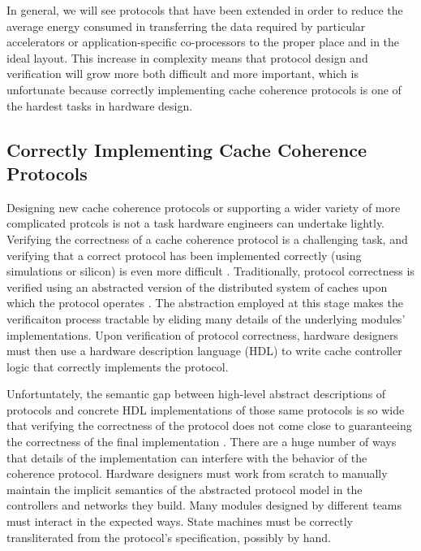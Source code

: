 In general, we will see protocols that have been extended in order to reduce the average energy consumed in transferring the data required by particular accelerators or application-specific co-processors to the proper place and in the ideal layout.
This increase in complexity means that protocol design and verification will grow more both difficult and more important,
which is unfortunate because correctly implementing cache coherence protocols is one of the hardest tasks in hardware design.

\subsection{Correctly Implementing Cache Coherence Protocols}

Designing new cache coherence protocols or supporting a wider variety of more complicated protcols is not a task hardware engineers can undertake lightly.
Verifying the correctness of a cache coherence protocol is a challenging task, and
verifying that a correct protocol has been implemented correctly (using simulations or silicon) is even more difficult
\cite{deorio2008post, bentley2001validating, burckhardt2005verifying, clarke1995verification, dill1992protocol, wood1990verifying}.
Traditionally, protocol correctness is verified using an abstracted version of the distributed system of caches upon which the protocol operates
\cite{talupur2008going, delzanno2003constraint, pong1997verification, wood1990verifying, mcmillan2001parameterized}.
The abstraction employed at this stage makes the verificaiton process tractable by eliding many details of the underlying modules' implementations.
Upon verification of protocol correctness, hardware designers must then use a hardware description language (HDL) to write cache controller logic that correctly implements the protocol.

Unfortuntately, the semantic gap between high-level abstract descriptions of protocols and 
concrete HDL implementations of those same protocols is so wide that verifying the correctness of the protocol
does not come close to guaranteeing the correctness of the final implementation \cite{dave-memocode05}.
There are a huge number of ways that details of the implementation can interfere with the behavior of the coherence protocol.
Hardware designers must work from scratch to manually maintain the implicit semantics of the abstracted protocol model in the controllers and networks they build.
Many modules designed by different teams must interact in the expected ways.
State machines must be correctly transliterated from the protocol's specification, possibly by hand.

